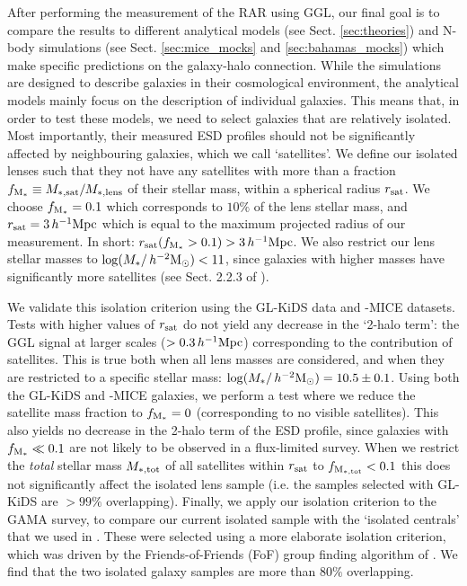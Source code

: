 \documentclass[usenatbib]{mnras}
\newcommand{\hmsun}{\,h^{-2} {\rm M_\odot}}
\newcommand{\hMpc}{\, h^{-1}{\rm{Mpc}} }
\newcommand{\un}[1]{_{\rm #1}}
\begin{document}
After performing the measurement of the RAR using GGL, our final goal is to compare the results to different analytical models (see Sect. \ref{sec:theories}) and N-body simulations (see Sect. \ref{sec:mice_mocks} and \ref{sec:bahamas_mocks}) which make specific predictions on the galaxy-halo connection. While the simulations are designed to describe galaxies in their cosmological environment, the analytical models mainly focus on the description of individual galaxies. This means that, in order to test these models, we need to select galaxies that are relatively isolated. Most importantly, their measured ESD profiles should not be significantly affected by neighbouring galaxies, which we call `satellites'. We define our isolated lenses such that they not have any satellites with more than a fraction $f\un{M_*} \equiv M\un{*,sat}/M\un{*,lens}$ of their stellar mass, within a spherical radius $r\un{sat}$. We choose $f\un{M_*}=0.1$ which corresponds to $10\%$ of the lens stellar mass, and $r\un{sat}=3\hMpc$ which is equal to the maximum projected radius of our measurement. In short: $r\un{sat}(f\un{M_*}>0.1)>3\hMpc$. We also restrict our lens stellar masses to $\log(M_*/\hmsun)<11$, since galaxies with higher masses have significantly more satellites (see Sect. 2.2.3 of \citealp{brouwer2017}).

We validate this isolation criterion using the GL-KiDS data and -MICE datasets. Tests with higher values of $r\un{sat}$ do not yield any decrease in the `2-halo term': the GGL signal at larger scales ($>0.3\hMpc$) corresponding to the contribution of satellites. This is true both when all lens masses are considered, and when they are restricted to a specific stellar mass: $\log(M_*/\hmsun)=10.5\pm0.1$. Using both the GL-KiDS and -MICE galaxies, we perform a test where we reduce the satellite mass fraction to $f\un{M_*}=0$ (corresponding to no visible satellites). This also yields no decrease in the 2-halo term of the ESD profile, since galaxies with $f\un{M_*}\ll0.1$ are not likely to be observed in a flux-limited survey. When we restrict the \emph{total} stellar mass $M\un{*,tot}$ of all satellites within $r\un{sat}$ to $f\un{M\un{*,tot}}<0.1$ this does not significantly affect the isolated lens sample (i.e. the samples selected with GL-KiDS are $>99\%$ overlapping). Finally, we apply our isolation criterion to the GAMA survey, to compare our current isolated sample with the `isolated centrals' that we used in \cite{brouwer2017}. These were selected using a more elaborate isolation criterion, which was driven by the Friends-of-Friends (FoF) group finding algorithm of \cite{robotham2011}. We find that the two isolated galaxy samples are more than $80\%$ overlapping.
\end{document}
